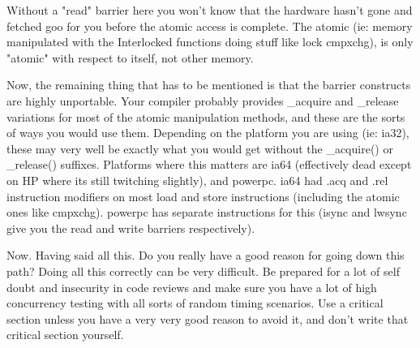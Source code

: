 Without a "read" barrier here you won't know that the hardware hasn't gone and fetched goo for you before the atomic access is complete. The atomic (ie: memory manipulated with the Interlocked functions doing stuff like lock cmpxchg), is only "atomic" with respect to itself, not other memory.

Now, the remaining thing that has to be mentioned is that the barrier constructs are highly unportable. Your compiler probably provides \_acquire and \_release variations for most of the atomic manipulation methods, and these are the sorts of ways you would use them. Depending on the platform you are using (ie: ia32), these may very well be exactly what you would get without the \_acquire() or \_release() suffixes. Platforms where this matters are ia64 (effectively dead except on HP where its still twitching slightly), and powerpc. ia64 had .acq and .rel instruction modifiers on most load and store instructions (including the atomic ones like cmpxchg). powerpc has separate instructions for this (isync and lwsync give you the read and write barriers respectively).

Now. Having said all this. Do you really have a good reason for going down this path? Doing all this correctly can be very difficult. Be prepared for a lot of self doubt and insecurity in code reviews and make sure you have a lot of high concurrency testing with all sorts of random timing scenarios. Use a critical section unless you have a very very good reason to avoid it, and don't write that critical section yourself.


\EndArticle
